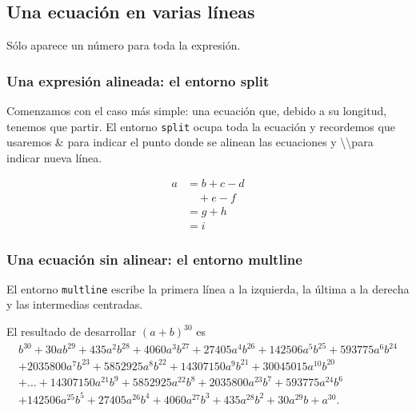 \documentclass{article}
\numberwithin{equation}{section}
\theoremstyle{plain}
\theoremstyle{definition}
\theoremstyle{remark}
\begin{document}
\subsection{Una ecuación en varias líneas}

Sólo aparece un número para toda la expresión.

\subsubsection*{Una expresión alineada: el entorno split}

Comenzamos con el caso más simple: una ecuación que, debido a su longitud, tenemos que partir. El entorno \texttt{split} ocupa toda la ecuación y recordemos que usaremos \& para indicar el punto donde se alinean las ecuaciones y \textbackslash\textbackslash para indicar nueva línea.
\begin{codigo-lado}
\begin{equation} \label{eq:ejemplo-split}
	\begin{split}
		a & = b+c-d\\
		  & \quad {}+e-f\\
          & = g+h\\
          & = i
\end{split}
\end{equation}
\end{codigo-lado}

\subsubsection*{Una ecuación sin alinear: el entorno multline}

El entorno \texttt{multline} escribe la primera línea a la izquierda, la última a la derecha y las intermedias centradas.

\begin{codigo-arriba}
El resultado de desarrollar \((a+b)^{30}\) es
\begin{multline*}
b^{30}+30 a b^{29}+435 a^2 b^{28}+4060 a^3 b^{27} + 27405 a^4 b^{26} 
+ 142506 a^5 b^{25} + 593775 a^6 b^{24}\\ 
+ 2035800 a^7 b^{23} + 5852925 a^8 b^{22} + 14307150 a^9 b^{21} + 30045015 a^{10} b^{20} \\
+ \dots +  14307150 a^{21} b^9 + 5852925 a^{22} b^8 
+ 2035800 a^{23} b^7 + 593775 a^{24} b^6 \\
+ 142506 a^{25} b^5 + 27405 a^{26} b^4 + 4060 a^{27} b^{3} + 435 a^{28} b^2 
+30 a^{29} b + a^{30} .
\end{multline*}
\end{codigo-arriba}
\end{document}
